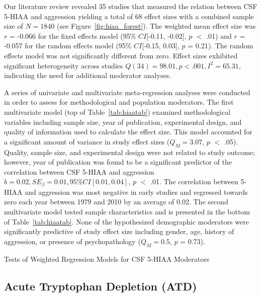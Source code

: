 \documentclass[man]{apa6}\usepackage{graphicx, color}
\begin{document}
Our literature review revealed 35 studies that measured the relation between CSF 5-HIAA and aggression yielding a total of 68 effect sizes with a combined sample size of $N = 1840$ (see Figure~\ref{fig:hiaa_forest}). The weighted mean effect size was $r$ = -0.066 for the fixed effects model (95\% $CI$[-0.11, -0.02], $p$ $<$ .01) and $r$ = -0.057 for the random effects model (95\% $CI$[-0.15, 0.03], $p$ = 0.21). The random effects model was not significantly different from zero. Effect sizes exhibited significant heterogeneity across studies \ensuremath{Q(34) = 98.01, p < .001, I^2 = 65.31}, indicating the need for additional moderator analyses.


A series of univariate and multivariate meta-regression analyses were conducted in order to assess for methodological and population moderators. The first multivariate model (top of Table~\ref{tab:hiaatab}) examined methodological variables including sample size, year of publication, experimental design, and quality of information used to calculate the effect size. This model accounted for a significant amount of variance in study effect sizes ($Q_M = 3.07$, $p$ $<$ .05). Quality, sample size, and experimental design were not related to study outcome; however, year of publication was found to be a significant predictor of the correlation between CSF 5-HIAA and aggression $b = 0.02, SE_{\beta} = 0.01, 95\% CI [0.01,0.04]$, $p$ $<$ .01. The correlation between 5-HIAA and aggression was most negative in early studies and regressed towards zero each year between 1979 and 2010 by an average of 0.02. The second multivariate model tested sample characteristics and is presented in the bottom of Table~\ref{tab:hiaatab}. None of the hypothesized demographic moderators were significantly predictive of study effect size including gender, age, history of aggression, or presence of psychopathology ($Q_M = 0.5$, $p$ = 0.73).



\begin{table*}[p]
\caption{Tests of Weighted Regression Models for CSF 5-HIAA Moderators}
\label{tab:hiaatab}
\footnotesize{\hspace*{-.6in}}
\end{table*}


\subsection{Acute Tryptophan Depletion (ATD)}
\end{document}
